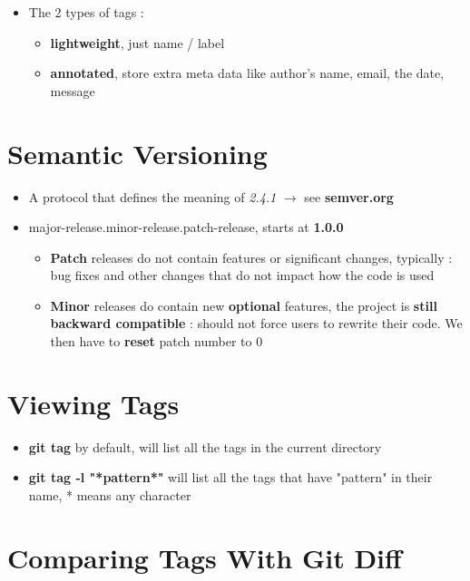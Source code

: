 \documentclass{report}
\begin{document}
\begin{itemize}
	\item The 2 types of tags :
		\begin{itemize}
			\item \textbf{lightweight}, just name / label 
			\item \textbf{annotated}, store extra meta data like author's name, email, the date, message
		\end{itemize}
\end{itemize}


\section{Semantic Versioning}

\begin{itemize}
	\item A protocol that defines the meaning of \textit{2.4.1} $\rightarrow$ see \textbf{semver.org} 
	\item major-release.minor-release.patch-release, starts at \textbf{1.0.0} 
		\begin{itemize}
			\item \textbf{Patch} releases do not contain features or significant changes, typically : bug fixes and other changes that do not impact how the code is used 
			\item \textbf{Minor} releases do contain new \textbf{optional} features, the project is \textbf{still backward compatible} : should not force users to rewrite their code. We then have to \textbf{reset} patch number to 0
		\end{itemize}
\end{itemize}


\section{Viewing Tags}

\begin{itemize}
	\item \textbf{git tag} by default, will list all the tags in the current directory 
	\item \textbf{git tag -l "*pattern*"} will list all the tags that have "pattern" in their name, * means any character
\end{itemize}


\section{Comparing Tags With Git Diff}
\end{document}
